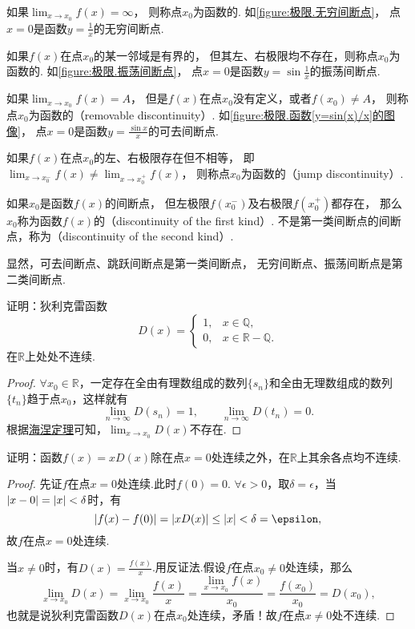 如果\(\lim_{x \to x_0}f(x) = \infty\)，
则称点\(x_0\)为函数的.
如\cref{figure:极限.无穷间断点}，
点\(x=0\)是函数\(y=\frac{1}{x}\)的无穷间断点.

如果\(f(x)\)在点\(x_0\)的某一邻域是有界的，
但其左、右极限均不存在，则称点\(x_0\)为函数的.
如\cref{figure:极限.振荡间断点}，
点\(x=0\)是函数\(y=\sin\frac{1}{x}\)的振荡间断点.

如果\(\lim_{x \to x_0}f(x) = A\)，
但是\(f(x)\)在点\(x_0\)没有定义，或者\(f(x_0) \neq A\)，
则称点\(x_0\)为函数的（removable discontinuity）.
如\cref{figure:极限.函数[y=sin(x)/x]的图像}，
点\(x=0\)是函数\(y=\frac{\sin x}{x}\)的可去间断点.

如果\(f(x)\)在点\(x_0\)的左、右极限存在但不相等，
即\(\lim_{x \to x_0^-}f(x) \neq \lim_{x \to x_0^+}f(x)\)，
则称点\(x_0\)为函数的（jump discontinuity）.

如果\(x_0\)是函数\(f(x)\)的间断点，
但左极限\(f(x_0^-)\)及右极限\(f(x_0^+)\)都存在，
那么\(x_0\)称为函数\(f(x)\)的（discontinuity of the first kind）.
不是第一类间断点的间断点，称为（discontinuity of the second kind）.

显然，可去间断点、跳跃间断点是第一类间断点，
无穷间断点、振荡间断点是第二类间断点.

\begin{example}\label{example:极限.狄利克雷函数在实数域上处处不连续}
证明：狄利克雷函数\[
D(x) = \left\{ \begin{array}{ll}
1, & x \in \mathbb{Q}, \\
0, & x \in \mathbb{R} - \mathbb{Q}.
\end{array} \right.
\]在\(\mathbb{R}\)上处处不连续.
\begin{proof}
\(\forall x_0 \in \mathbb{R}\)，一定存在全由有理数组成的数列\(\{s_n\}\)和全由无理数组成的数列\(\{t_n\}\)趋于点\(x_0\)，这样就有\[
\lim_{n\to\infty} D(s_n) = 1,
\qquad
\lim_{n\to\infty} D(t_n) = 0.
\]
根据\hyperref[theorem:极限.海涅定理]{海涅定理}可知，\(\lim_{x \to x_0} D(x)\)不存在.
\end{proof}
\end{example}

\begin{example}
证明：函数\(f(x) = x D(x)\)除在点\(x = 0\)处连续之外，在\(\mathbb{R}\)上其余各点均不连续.
\begin{proof}
先证\(f\)在点\(x = 0\)处连续.此时\(f(0) = 0\).
\(\forall \epsilon > 0\)，取\(\delta = \epsilon\)，当\(\abs{x - 0} = \abs{x} < \delta\)时，有\[
\abs{f(x) - f(0)}
= \abs{ x D(x) }
\leq \abs{x} < \delta = \epsilon,
\]故\(f\)在点\(x = 0\)处连续.

当\(x \neq 0\)时，有\(D(x) = \frac{f(x)}{x}\).用反证法.假设\(f\)在点\(x_0 \neq 0\)处连续，那么\[
\lim_{x \to x_0} D(x) = \lim_{x \to x_0} \frac{f(x)}{x}
= \frac{ \lim_{x \to x_0} f(x) }{x_0}
= \frac{f(x_0)}{x_0} = D(x_0),
\]也就是说狄利克雷函数\(D(x)\)在点\(x_0\)处连续，矛盾！故\(f\)在点\(x \neq 0\)处不连续.
\end{proof}
\end{example}

